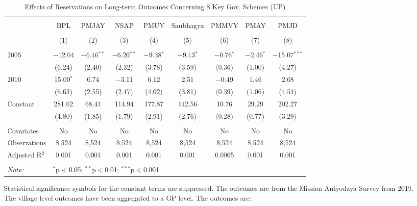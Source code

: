 \begin{table}[!htbp]
\centering
\begin{threeparttable}

  \caption{Effects of Reservations on Long-term Outcomes Concerning 8 Key Gov. Schemes (UP)} 
  \label{up_shrug_schemes_05_10} 
\scriptsize 
\begin{tabular}{@{\extracolsep{0pt}}lcccccccc} 
\\[-1.8ex]\hline 
\hline \\[-1.8ex] 
 & BPL & PMJAY & NSAP & PMUY & Saubhagya & PMMVY & PMAY & PMJD \\ 
\\[-1.8ex] & (1) & (2) & (3) & (4) & (5) & (6) & (7) & (8)\\ 
\hline \\[-1.8ex] 
 2005 & $-$12.04 & $-$6.46$^{**}$ & $-$6.20$^{**}$ & $-$9.38$^{*}$ & $-$9.13$^{*}$ & $-$0.76$^{*}$ & $-$2.46$^{*}$ & $-$15.07$^{***}$ \\ 
  & (6.24) & (2.40) & (2.32) & (3.78) & (3.59) & (0.36) & (1.00) & (4.27) \\ 
  2010 & 15.00$^{*}$ & 0.74 & $-$3.11 & 6.12 & 2.51 & $-$0.49 & 1.46 & 2.68 \\ 
  & (6.63) & (2.55) & (2.47) & (4.02) & (3.81) & (0.39) & (1.06) & (4.54) \\ 
  Constant & 281.62 & 68.41 & 114.94 & 177.87 & 142.56 & 10.76 & 29.29 & 202.27 \\ 
  & (4.80) & (1.85) & (1.79) & (2.91) & (2.76) & (0.28) & (0.77) & (3.29) \\ 
 \hline \\[-1.8ex] 
Covariates & No & No & No & No & No & No & No & No \\ 
Observations & 8,524 & 8,524 & 8,524 & 8,524 & 8,524 & 8,524 & 8,524 & 8,524 \\ 
Adjusted R$^{2}$ & 0.001 & 0.001 & 0.001 & 0.001 & 0.001 & 0.0005 & 0.001 & 0.001 \\ 
\hline 
\hline \\[-1.8ex] 
\textit{Note:}  & \multicolumn{8}{l}{$^{*}$p$<$0.05; $^{**}$p$<$0.01; $^{***}$p$<$0.001} \\ 
\end{tabular} 
\begin{tablenotes}[flushleft]
\scriptsize
\item[] Statistical significance symbols for the constant terms are suppressed. The outcomes are from the Mission Antyodaya Survey from 2019.
                   The village level outcomes have been aggregated to a GP level. The outcomes are:

\end{tablenotes}
\end{threeparttable}
\end{table}
